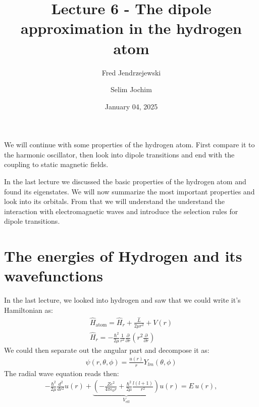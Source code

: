 \documentclass[10pt]{article}
\let\cite\citep
\renewenvironment{abstract}
  {{\bfseries\noindent{\abstractname}\par\nobreak}\footnotesize}
  {\bigskip}
\providecommand\citep{\cite}
\begin{document}
\title{Lecture 6 - The dipole approximation in the hydrogen atom}



\author[1]{Fred Jendrzejewski}%
\author[2]{Selim Jochim}%
%
%


\vspace{-1em}



  
  \date{January 04, 2025}


\begingroup
\let\center\flushleft
\let\endcenter\endflushleft
\maketitle
\endgroup





\begin{abstract}
We will continue with some properties of the hydrogen atom. First compare it to the harmonic oscillator, then look into dipole transitions and end with the coupling to static magnetic fields.%
\end{abstract}%



\sloppy


In the last lecture \cite{atom} we discussed the basic properties of the hydrogen atom and found its eigenstates. We will now summarize the most important properties and look into its orbitals. From that we will understand the understand the interaction with electromagnetic waves and introduce the selection rules for dipole transitions.

\section{The energies of Hydrogen and its wavefunctions}
In the last lecture, we looked into hydrogen and saw that we could write it's Hamiltonian as:
\begin{align}
\hat{H}_\text{atom} = \hat{H}_r + \frac{\hat{L}}{2\mu r^2}+V(r) \\
\hat{H}_r = -\frac{\hbar^2}{2\mu}\frac{1}{r^2}\frac{\partial}{\partial r}\left(r^2\frac{\partial}{\partial r}\right)
\end{align}
We could then separate out the angular part and decompose it as:
\begin{align}
\psi (r,\theta,\phi) = \frac{u(r)}{r} Y_{lm}(\theta,\phi)
\end{align}
The radial wave equation reads then:
\begin{align}\label{Eq:RadWF}
-\frac{\hbar^2}{2\mu}\frac{d^2}{dr^2}u(r) +\underbrace{ \left( -\frac{Ze^2}{4\pi\epsilon_0 r} + \frac{\hbar^2}{2\mu} \frac{l(l+1)}{r^2} \right)}_{V_{\text{eff}}} u(r) = E \, u(r),\end{align}
\end{document}
